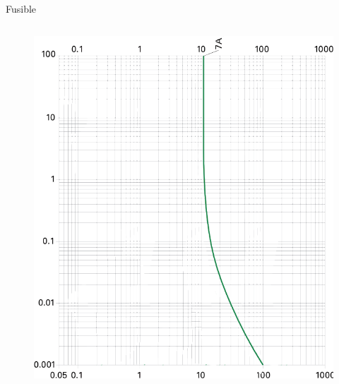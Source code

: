 \begin{frame}{Fusible}
\begin{columns}
        \begin{column}{0.66\textwidth}
            \begin{figure}
                \centering
                \includegraphics[width=\textwidth, height=0.8\textheight, keepaspectratio]{pictures/fuse-curve.png}
            \end{figure}
        \end{column}
    \end{columns}
\end{frame}

